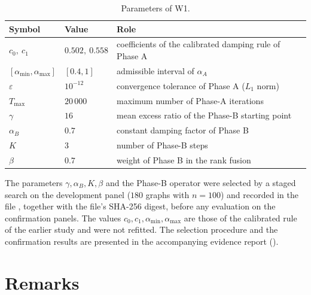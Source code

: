 \documentclass[11pt,a4paper]{article}
\newcommand{\Czero}{0.502}
\newcommand{\Cone}{0.558}
\newcommand{\Amin}{0.4}
\newcommand{\Amax}{1}
\newcommand{\Tol}{10^{-12}}
\newcommand{\Tmax}{20\,000}
\newcommand{\Gam}{16}
\newcommand{\AB}{0.7}
\newcommand{\KB}{3}
\newcommand{\Beta}{0.7}
\begin{document}
\begin{table}[H]
\centering
\caption{Parameters of W1.}\label{tab:params}
\small
\begin{tabular}{@{}l l l@{}}
\toprule
Symbol & Value & Role \\
\midrule
$c_0,\ c_1$ & $\Czero,\ \Cone$ & coefficients of the calibrated damping rule of Phase A \\
$[\alpha_{\min},\alpha_{\max}]$ & $[\Amin,\Amax]$ & admissible interval of $\alpha_A$ \\
$\varepsilon$ & $\Tol$ & convergence tolerance of Phase A ($L_1$ norm) \\
$T_{\max}$ & $\Tmax$ & maximum number of Phase-A iterations \\
$\gamma$ & $\Gam$ & mean excess ratio of the Phase-B starting point \\
$\alpha_B$ & $\AB$ & constant damping factor of Phase B \\
$K$ & $\KB$ & number of Phase-B steps \\
$\beta$ & $\Beta$ & weight of Phase B in the rank fusion \\
\bottomrule
\end{tabular}
\end{table}

The parameters $\gamma,\alpha_B,K,\beta$ and the Phase-B operator were selected by a staged search on the development panel ($180$ graphs with $n=100$) and recorded in the file , together with the file's SHA-256 digest, before any evaluation on the confirmation panels. The values $c_0,c_1,\alpha_{\min},\alpha_{\max}$ are those of the calibrated rule of the earlier study and were not refitted. The selection procedure and the confirmation results are presented in the accompanying evidence report ().

\section{Remarks}
\end{document}
